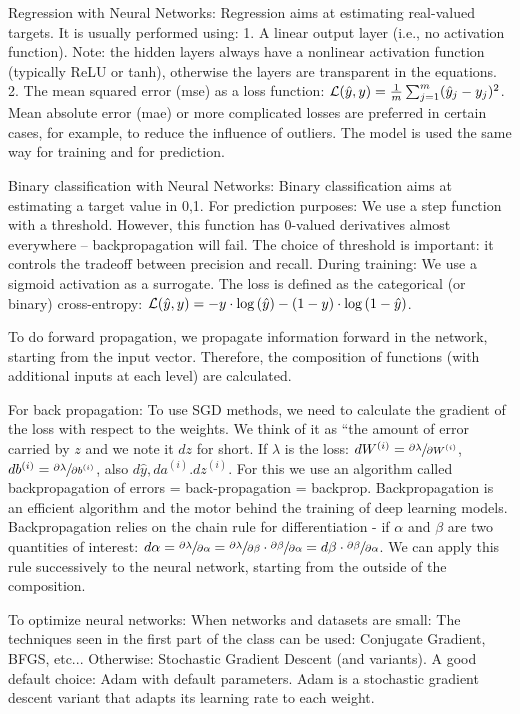 Regression with Neural Networks: Regression aims at estimating real-valued targets.
It is usually performed using:
1. A linear output layer (i.e., no activation function). Note: the hidden layers always have a nonlinear activation function (typically ReLU or tanh), otherwise the layers are transparent in the equations.
2. The mean squared error (mse) as a loss function: $\mathcal{L}(\hat{y}, y) = \frac{1}{m} \sum_{j=1}^m (\hat{y}_j - y_j)^2$.
Mean absolute error (mae) or more complicated losses are preferred in certain cases, for example, to reduce the influence of outliers.
The model is used the same way for training and for prediction.

Binary classification with Neural Networks: Binary classification aims at estimating a target value in {0,1}.
For prediction purposes:
We use a step function with a threshold.
However, this function has 0-valued derivatives almost everywhere – backpropagation will fail. The choice of threshold is important: it controls the tradeoff between precision and recall.
During training:
We use a sigmoid activation as a surrogate.
The loss is defined as the categorical (or binary) cross-entropy:
$\mathcal{L}(\hat{y}, y) = -y \cdot \log{(\hat{y})} - (1-y)\cdot \log{(1-\hat{y})}$.

To do forward propagation, we propagate information forward in the network,
starting from the input vector. Therefore, the composition of functions (with additional inputs at each level) are calculated.

For back propagation:
To use SGD methods, we need to calculate the gradient of the loss with respect to the weights. We think of it as “the amount of error carried by $z$ and we note it $dz$ for short. If $\lambda$ is the loss: 
$dW^{(i)} = \sfrac{\partial \lambda}{\partial W^{(i)}}$, $db^{(i)} = \sfrac{\partial \lambda}{\partial b^{(i)}}$, also $d\hat{y}, da^{(i)}. dz^{(i)}$.
For this we use an algorithm called backpropagation of errors = back-propagation = backprop. Backpropagation is an efficient algorithm and the motor behind the training of deep learning models.
Backpropagation relies on the chain rule for differentiation - if $\alpha$ and $\beta$ are two quantities of interest: 
$d\alpha = \sfrac{\partial \lambda}{\partial \alpha} =  \sfrac{\partial \lambda}{\partial \beta} \cdot  \sfrac{\partial \beta}{\partial \alpha} = d\beta \cdot  \sfrac{\partial \beta}{\partial \alpha}$.
We can apply this rule successively to the neural network, starting from the outside of the composition.

To optimize neural networks: When networks and datasets are small:
The techniques seen in the first part of the class can be used: Conjugate Gradient, BFGS, etc...
Otherwise: Stochastic Gradient Descent (and variants).
A good default choice: Adam with default parameters.
Adam is a stochastic gradient descent variant that adapts its learning rate to each weight.


